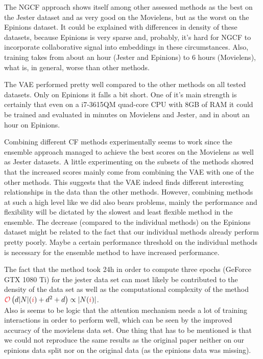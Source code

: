 


The NGCF approach shows itself among other assessed methods as the best on the Jester dataset 
and as very good on the Movielens, but as the worst on the Epinions dataset.
It could be explained with differences in density of these datasets, because
Epinions is very sparse and, probably, it's hard for NGCF to incorporate 
collaborative signal into embeddings in these circumstances.
Also, training takes from about an hour (Jester and Epinions) to 6 hours (Movielens),
what is, in general, worse than other methods.

The VAE performed pretty well compared to the other methods on all tested datasets. 
Only on Epinions it falls a bit short. 
One of it's main strength is certainly that even on a i7-3615QM quad-core CPU with 8GB of RAM it could be trained and evaluated in minutes on Movielens and Jester, and in about an hour on Epinions.

Combining different CF methods experimentally seems to work since the ensemble approach managed to achieve the best scores on the Movielens as well as Jester datasets. 
A little experimenting on the subsets of the methods showed that the increased scores mainly  come from combining the VAE with one of the other methods. 
This suggests that the VAE indeed finds different interesting relationships in the data than the other methods. 
However, combining methods at such a high level like we did also bears problems, mainly the performance and flexibility will be dictated by the slowest and least flexible method in the ensemble. 
The decrease (compared to the individual methods) on the Epinions dataset might be related to the fact that our individual methods already perform pretty poorly. 
Maybe a certain performance threshold on the individual methods is necessary for the ensemble method to have increased performance.

The fact that the method took 24h in order to compute three epochs (GeForce GTX 1080 Ti) for the jester data set can most likely be contributed to the density of the data set as well as the computational complexity of the method $\bigO\left(d\abs{N}(\idxi)+d^2+d\right)\propto\abs{N(\idxi)}$.\\
Also is seems to be logic that the attention mechanism needs a lot of training interactions in order to perform well, which can be seen by the improved accuracy of the movielens data set.
One thing that has to be mentioned is that we could not reproduce the same results as the original paper neither on our epinions data split nor on the original data (as the epinions data was missing).